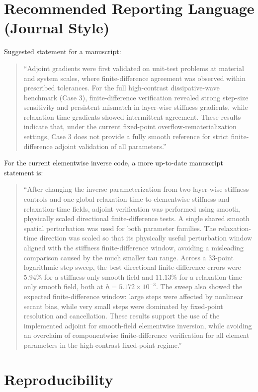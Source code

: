 \documentclass[11pt]{article}
\begin{document}
\section{Recommended Reporting Language (Journal Style)}
Suggested statement for a manuscript:
\begin{quote}
``Adjoint gradients were first validated on unit-test problems at material and system scales, where finite-difference agreement was observed within prescribed tolerances.
For the full high-contrast dissipative-wave benchmark (Case 3), finite-difference verification revealed strong step-size sensitivity and persistent mismatch in layer-wise stiffness gradients, while relaxation-time gradients showed intermittent agreement.
These results indicate that, under the current fixed-point overflow-rematerialization settings, Case 3 does not provide a fully smooth reference for strict finite-difference adjoint validation of all parameters.''
\end{quote}

For the current elementwise inverse code, a more up-to-date manuscript statement is:
\begin{quote}
``After changing the inverse parameterization from two layer-wise stiffness controls and one global relaxation time to elementwise stiffness and relaxation-time fields, adjoint verification was performed using smooth, physically scaled directional finite-difference tests.
A single shared smooth spatial perturbation was used for both parameter families.
The relaxation-time direction was scaled so that its physically useful perturbation window aligned with the stiffness finite-difference window, avoiding a misleading comparison caused by the much smaller tau range.
Across a 33-point logarithmic step sweep, the best directional finite-difference errors were \(5.94\%\) for a stiffness-only smooth field and \(11.13\%\) for a relaxation-time-only smooth field, both at \(h=5.172\times10^{-3}\).
The sweep also showed the expected finite-difference window: large steps were affected by nonlinear secant bias, while very small steps were dominated by fixed-point resolution and cancellation.
These results support the use of the implemented adjoint for smooth-field elementwise inversion, while avoiding an overclaim of componentwise finite-difference verification for all element parameters in the high-contrast fixed-point regime.''
\end{quote}

\section{Reproducibility}
\end{document}
